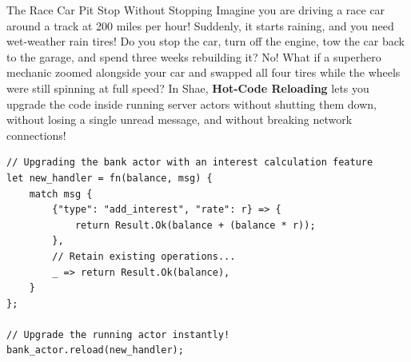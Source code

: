 \begin{kidbox}{The Race Car Pit Stop Without Stopping}
Imagine you are driving a race car around a track at 200 miles per hour!
Suddenly, it starts raining, and you need wet-weather rain tires!
Do you stop the car, turn off the engine, tow the car back to the garage, and spend three weeks rebuilding it?
No! What if a superhero mechanic zoomed alongside your car and swapped all four tires while the wheels were still spinning at full speed?
In Shae, \textbf{Hot-Code Reloading} lets you upgrade the code inside running server actors without shutting them down, without losing a single unread message, and without breaking network connections!
\end{kidbox}

\begin{lstlisting}[language=shaelang]
// Upgrading the bank actor with an interest calculation feature
let new_handler = fn(balance, msg) {
    match msg {
        {"type": "add_interest", "rate": r} => {
            return Result.Ok(balance + (balance * r));
        },
        // Retain existing operations...
        _ => return Result.Ok(balance),
    }
};

// Upgrade the running actor instantly!
bank_actor.reload(new_handler);
\end{lstlisting}
